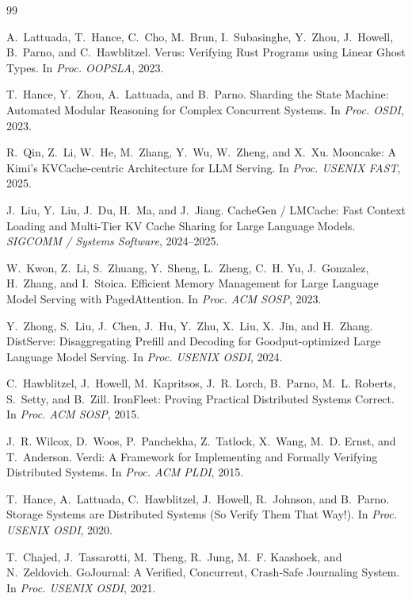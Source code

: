 \documentclass[11pt,a4paper]{article}
\begin{document}
\begin{thebibliography}{99}

A.~Lattuada, T.~Hance, C.~Cho, M.~Brun, I.~Subasinghe, Y.~Zhou, J.~Howell, B.~Parno, and C.~Hawblitzel.
\newblock Verus: Verifying Rust Programs using Linear Ghost Types.
\newblock In \emph{Proc. OOPSLA}, 2023.

T.~Hance, Y.~Zhou, A.~Lattuada, and B.~Parno.
\newblock Sharding the State Machine: Automated Modular Reasoning for Complex Concurrent Systems.
\newblock In \emph{Proc. OSDI}, 2023.

R.~Qin, Z.~Li, W.~He, M.~Zhang, Y.~Wu, W.~Zheng, and X.~Xu.
\newblock Mooncake: A Kimi's KVCache-centric Architecture for LLM Serving.
\newblock In \emph{Proc. USENIX FAST}, 2025.

J.~Liu, Y.~Liu, J.~Du, H.~Ma, and J.~Jiang.
\newblock CacheGen / LMCache: Fast Context Loading and Multi-Tier KV Cache Sharing for Large Language Models.
\newblock \emph{SIGCOMM / Systems Software}, 2024--2025.

W.~Kwon, Z.~Li, S.~Zhuang, Y.~Sheng, L.~Zheng, C.~H. Yu, J.~Gonzalez, H.~Zhang, and I.~Stoica.
\newblock Efficient Memory Management for Large Language Model Serving with PagedAttention.
\newblock In \emph{Proc. ACM SOSP}, 2023.

Y.~Zhong, S.~Liu, J.~Chen, J.~Hu, Y.~Zhu, X.~Liu, X.~Jin, and H.~Zhang.
\newblock DistServe: Disaggregating Prefill and Decoding for Goodput-optimized Large Language Model Serving.
\newblock In \emph{Proc. USENIX OSDI}, 2024.

C.~Hawblitzel, J.~Howell, M.~Kapritsos, J.~R. Lorch, B.~Parno, M.~L. Roberts, S.~Setty, and B.~Zill.
\newblock IronFleet: Proving Practical Distributed Systems Correct.
\newblock In \emph{Proc. ACM SOSP}, 2015.

J.~R. Wilcox, D.~Woos, P.~Panchekha, Z.~Tatlock, X.~Wang, M.~D. Ernst, and T.~Anderson.
\newblock Verdi: A Framework for Implementing and Formally Verifying Distributed Systems.
\newblock In \emph{Proc. ACM PLDI}, 2015.

T.~Hance, A.~Lattuada, C.~Hawblitzel, J.~Howell, R.~Johnson, and B.~Parno.
\newblock Storage Systems are Distributed Systems (So Verify Them That Way!).
\newblock In \emph{Proc. USENIX OSDI}, 2020.

T.~Chajed, J.~Tassarotti, M.~Theng, R.~Jung, M.~F. Kaashoek, and N.~Zeldovich.
\newblock GoJournal: A Verified, Concurrent, Crash-Safe Journaling System.
\newblock In \emph{Proc. USENIX OSDI}, 2021.


\end{thebibliography}
\end{document}
